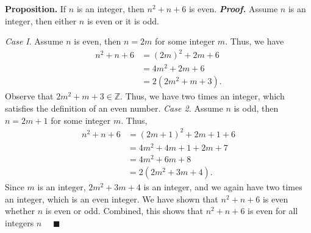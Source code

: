 \documentclass{report}
\begin{document}
\begin{itemize}
            \bigbreak \noindent 
            \textbf{Proposition.} If $n$ is an integer, then $n^{2} + n + 6$ is even.
            \bigbreak \noindent 
            \textbf{\textit{Proof.}} Assume $n$ is an integer, then either $n$ is even or it is odd.
            \begin{tcolorbox}[penv]
                \textit{Case I}. Assume $n$ is even, then $n=2m$ for some integer $m$. Thus, we have
                \begin{align*}
                    n^{2} + n + 6 &= (2m)^{2} + 2m + 6 \\
                      &=4m^{2} + 2m + 6 \\
                      &= 2 (2m^{2} + m + 3)
              .\end{align*}
              \bigbreak \noindent 
              Observe that $2m^{2} + m + 3 \in \mathbb{Z}$. Thus, we have two times an integer, which satisfies the definition of an even number.
              \bigbreak \noindent 
              \textit{Case 2.} Assume $n$ is odd, then $n=2m+1$ for some integer $m$. Thus,
              \begin{align*}
                  n^{2} + n + 6 &= (2m+1)^{2} + 2m + 1 + 6 \\
                                &=4m^{2} + 4m + 1 + 2m + 7 \\
                                &= 4m^{2} + 6m + 8 \\
                                &= 2(2m^{2} + 3m + 4)
              .\end{align*}
              \bigbreak \noindent 
              Since $m$ is an integer, $2m^{2} + 3m +4$ is an integer, and we again have two times an integer, which is an even integer.
              \bigbreak \noindent 
              We have shown that $n^{2} + n  + 6 $ is even whether $n$ is even or odd. Combined, this shows that $n^{2} + n + 6$ is even for all integers $n$ $\quad \blacksquare$
                

\end{tcolorbox}
\end{itemize}
\end{document}

